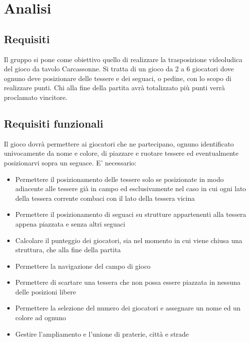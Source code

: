 \section{Analisi}
\subsection{Requisiti}

Il gruppo si pone come obiettivo quello di realizzare la trasposizione videoludica del gioco da tavolo Carcassonne. Si tratta di un gioco da 2 a 6 giocatori dove ognuno deve posizionare delle tessere e dei seguaci, o pedine, con lo scopo di realizzare punti. Chi alla fine della partita avrà totalizzato più punti verrà proclamato vincitore.

\subsection*{Requisiti funzionali}
Il gioco dovrà permettere ai giocatori che ne partecipano, ognuno identificato univocamente da nome e colore, di piazzare e ruotare tessere ed eventualmente posizionarvi sopra un seguace. E' necessario:

\begin{itemize}
\item Permettere il posizionamento delle tessere solo se posizionate in modo adiacente alle tessere già in campo ed esclusivamente nel caso in cui ogni lato della tessera corrente combaci con il lato della tessera vicina
\item Permettere il posizionamento di seguaci su strutture appartenenti alla tessera appena piazzata e senza altri seguaci
\item Calcolare il punteggio dei giocatori, sia nel momento in cui viene chiusa una struttura, che alla fine della partita
\item Permettere la navigazione del campo di gioco
\item Permettere di scartare una tessera che non possa essere piazzata in nessuna delle posizioni libere
\item Permettere la selezione del numero dei giocatori e assegnare un nome ed un colore ad ognuno
\item Gestire l'ampliamento e l'unione di praterie, città e strade
\end{itemize}

